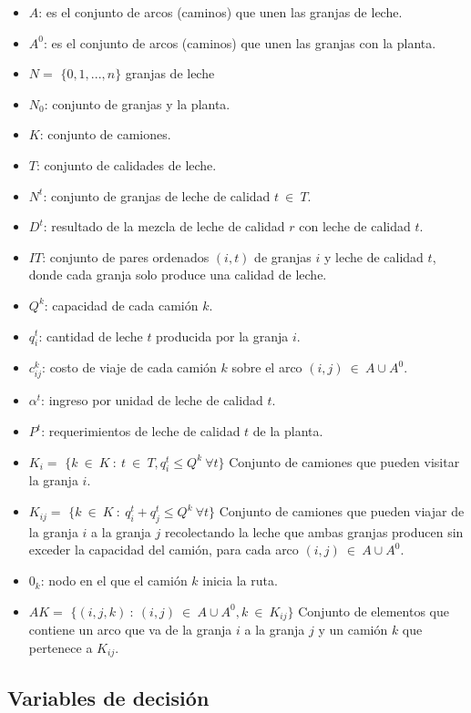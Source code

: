 \documentclass[letter, 10pt]{article}
\begin{document}
\begin{itemize}
    \item $A$: es el conjunto de arcos (caminos) que unen las granjas de leche.
    \item $A^0$: es el conjunto de arcos (caminos) que unen las granjas con la planta.
    \item $N = $ $\{0,1,...,n\}$ granjas de leche
    \item $N_0$: conjunto de granjas y la planta.
    \item $K$: conjunto de camiones.
    \item $T$: conjunto de calidades de leche.
    \item $N^t$: conjunto de granjas de leche de calidad $t \: \in \: T$.
    \item $D^t$: resultado de la mezcla de leche de calidad $r$ con leche de calidad $t$.
    \item $IT$: conjunto de pares ordenados $(i,t)$ de granjas $i$ y leche de calidad $t$, donde cada granja solo produce una calidad de leche.
    \item $Q^k$: capacidad de cada cami\'on $k$.
    \item $q^t_i$: cantidad de leche $t$ producida por la granja $i$.
    \item $c^k_{ij}$: costo de viaje de cada cami\'on $k$ sobre el arco $(i,j) \: \in \: A \cup A^0$.
    \item $\alpha^t$: ingreso por unidad de leche de calidad $t$.
    \item $P^t$: requerimientos de leche de calidad $t$ de la planta.
    \item $K_i = $ $\{k \: \in \: K \:: \: t \: \in \: T,q^t_i \leq Q^k \: \forall t\}$ Conjunto de camiones que pueden visitar la granja $i$.
    \item $K_{ij} = $ $\{k \: \in \: K \:: \: q^t_i + q^t_j \leq Q^k \: \forall t\}$ Conjunto de camiones que pueden viajar de la granja $i$ a la granja $j$ recolectando la leche que ambas granjas producen sin exceder la capacidad del cami\'on, para cada arco $(i,j) \: \in \: A \cup A^0$.
    \item $0_k$: nodo en el que el cami\'on $k$ inicia la ruta.
    \item $AK =$ $\{(i,j,k) \:: \: (i,j) \: \in \: A \cup A^0,k \: \in \: K_{ij}\}$ Conjunto de elementos que contiene un arco que va de la granja $i$ a la granja $j$ y un cami\'on $k$ que pertenece a $K_{ij}$.
\end{itemize}

\subsection{Variables de decisi\'on}
\end{document}
